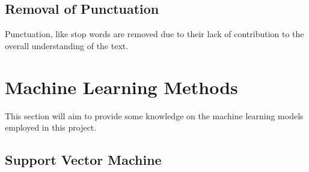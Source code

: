 \documentclass[11pt, a4paper]{article}
\begin{document}
\subsection{Removal of Punctuation}

Punctuation, like stop words are removed due to their lack of contribution to the overall understanding of the text.  

\section{Machine Learning Methods}

This section will aim to provide some knowledge on the machine learning models employed in this project. 

\subsection{Support Vector Machine}
\end{document}
